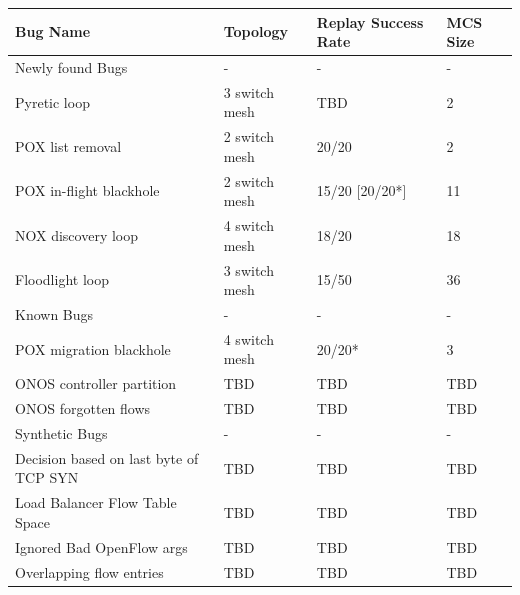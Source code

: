 \label{subsec:case_studies}

\begin{table}
\centering
\begin{tabular}{l|l|l|l}
Bug Name & Topology & Replay Success Rate & MCS Size \\
\hline
Newly found Bugs & - & - & - \\
\hline
Pyretic loop & 3 switch mesh & TBD & 2 \\
POX list removal & 2 switch mesh & 20/20 & 2 \\
POX in-flight blackhole & 2 switch mesh & 15/20 [20/20*] & 11 \\
NOX discovery loop & 4 switch mesh & 18/20 & 18 \\
Floodlight loop & 3 switch mesh & 15/50 & 36 \\
\hline
Known Bugs & - & - & - \\
\hline
POX migration blackhole & 4 switch mesh & 20/20* & 3 \\
ONOS controller partition & TBD & TBD & TBD \\
ONOS forgotten flows & TBD & TBD & TBD \\
\hline
Synthetic Bugs & - & - & - \\
\hline
Decision based on last byte of TCP SYN & TBD & TBD & TBD \\
Load Balancer Flow Table Space & TBD & TBD & TBD \\
Ignored Bad OpenFlow args & TBD & TBD & TBD \\
Overlapping flow entries & TBD & TBD & TBD \\
%

\end{tabular}
\end{table}
